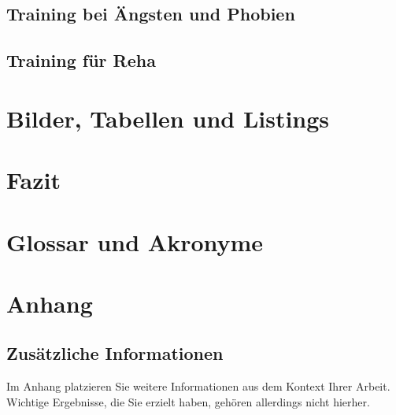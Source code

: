 \documentclass[
    12pt,
    a4paper,
    doubleside,
    BCOR=10mm,
    parskip=half,
    ngerman
]{scrbook}
\begin{document}
\section{Training bei Ängsten und Phobien}\label{sec:ÄuP}

\section{Training für Reha}\label{sec:Reha}




%

\chapter{Bilder, Tabellen und Listings}\label{sec:BilderTabellenListings}


\chapter{Fazit}\label{sec:summary}


\backmatter

\chapter{Glossar und Akronyme}\label{sec:glossary}


\singlespacing{}
\printnoidxglossary[type=\acronymtype,title={Abkürzungen\label{akronyme}}]
\printnoidxglossary[title={Glossar}]

\newpage
{}



\newpage
\chapter{Anhang}\label{appendix}
\section{Zusätzliche Informationen}\label{att:bigpicture}
Im Anhang platzieren Sie weitere Informationen aus dem Kontext Ihrer Arbeit.
Wichtige Ergebnisse, die Sie erzielt haben, gehören allerdings nicht hierher.
\end{document}
